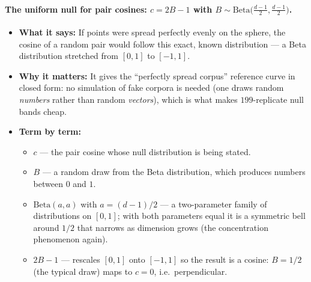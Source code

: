 \documentclass[11pt,letterpaper]{article}
\begin{document}
\paragraph{The uniform null for pair cosines: $c = 2B - 1$ with $B \sim
\mathrm{Beta}\!\big(\tfrac{d-1}{2}, \tfrac{d-1}{2}\big)$.}
\begin{itemize}
  \item \textbf{What it says:} If points were spread perfectly evenly on
  the sphere, the cosine of a random pair would follow this exact, known
  distribution --- a Beta distribution stretched from $[0,1]$ to $[-1,1]$.
  \item \textbf{Why it matters:} It gives the ``perfectly spread corpus''
  reference curve in closed form: no simulation of fake corpora is needed
  (one draws random \emph{numbers} rather than random \emph{vectors}), which is
  what makes $199$-replicate null bands cheap.
  \item \textbf{Term by term:}
  \begin{itemize}
    \item $c$ --- the pair cosine whose null distribution is being stated.
    \item $B$ --- a random draw from the Beta distribution, which produces
    numbers between $0$ and $1$.
    \item $\mathrm{Beta}(a, a)$ with $a = (d-1)/2$ --- a two-parameter
    family of distributions on $[0,1]$; with both parameters equal it is a
    symmetric bell around $1/2$ that narrows as dimension grows (the
    concentration phenomenon again).
    \item $2B - 1$ --- rescales $[0,1]$ onto $[-1,1]$ so the result is a
    cosine: $B = 1/2$ (the typical draw) maps to $c = 0$, i.e.\
    perpendicular.
  \end{itemize}
\end{itemize}
\end{document}
